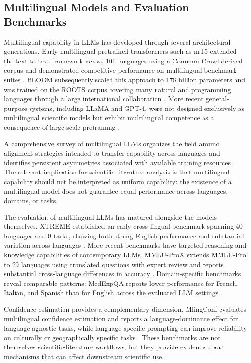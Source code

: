 \documentclass[acmsmall,nonacm]{acmart}
\begin{document}
\subsection{Multilingual Models and Evaluation Benchmarks}
Multilingual capability in LLMs has developed through several architectural generations. Early multilingual pretrained transformers such as mT5 extended the text-to-text framework across 101 languages using a Common Crawl-derived corpus and demonstrated competitive performance on multilingual benchmark suites \cite{Xue2021,Hu2020}. BLOOM subsequently scaled this approach to 176 billion parameters and was trained on the ROOTS corpus covering many natural and programming languages through a large international collaboration \cite{BigScience2022}. More recent general-purpose systems, including LLaMA and GPT-4, were not designed exclusively as multilingual scientific models but exhibit multilingual competence as a consequence of large-scale pretraining \cite{Touvron2023,OpenAI2023}.

A comprehensive survey of multilingual LLMs organizes the field around alignment strategies intended to transfer capability across languages and identifies persistent asymmetries associated with available training resources \cite{Qin2025}. The relevant implication for scientific literature analysis is that multilingual capability should not be interpreted as uniform capability: the existence of a multilingual model does not guarantee equal performance across languages, domains, or tasks.

The evaluation of multilingual LLMs has matured alongside the models themselves. XTREME established an early cross-lingual benchmark spanning 40 languages and 9 tasks, showing both strong English performance and substantial variation across languages \cite{Hu2020}. More recent benchmarks have targeted reasoning and knowledge capabilities of contemporary LLMs. MMLU-ProX extends MMLU-Pro to 29 languages using translated questions with expert review and reports substantial cross-language differences in accuracy \cite{Xuan2025}. Domain-specific benchmarks reveal comparable patterns: MedExpQA reports lower performance for French, Italian, and Spanish than for English across the evaluated LLM settings \cite{GarcíaFerrero2024}.

Confidence estimation provides a complementary dimension. MlingConf evaluates multilingual confidence estimation and reports a language-dominance effect for language-agnostic tasks, while language-specific prompting can improve reliability on culturally or geographically specific tasks \cite{Xue2024}. These benchmarks are not themselves scientific-literature workflows, but they provide evidence about mechanisms that can affect downstream scientific use.
\end{document}
